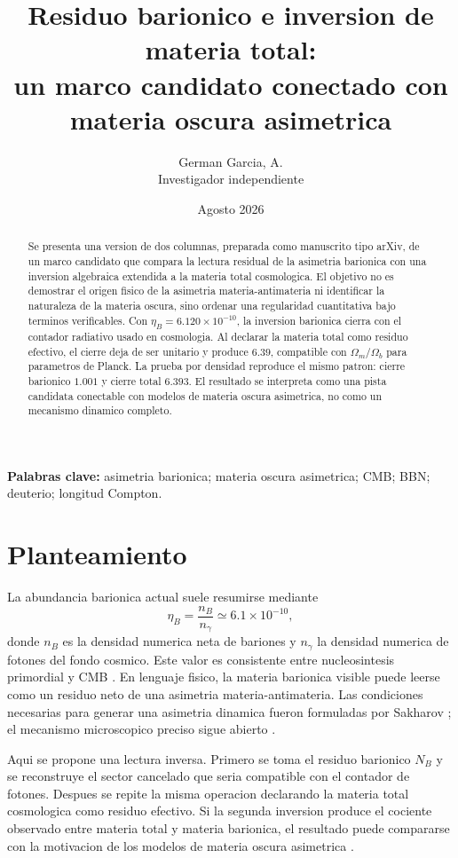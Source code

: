 \documentclass[10pt,twocolumn]{article}
\title{\vspace{-0.2in}Residuo barionico e inversion de materia total:\\
un marco candidato conectado con materia oscura asimetrica}
\author{German Garcia, A.\\Investigador independiente}
\date{Agosto 2026}
\begin{document}
\maketitle

\begin{abstract}
Se presenta una version de dos columnas, preparada como manuscrito tipo arXiv, de un marco candidato que compara la lectura residual de la asimetria barionica con una inversion algebraica extendida a la materia total cosmologica. El objetivo no es demostrar el origen fisico de la asimetria materia-antimateria ni identificar la naturaleza de la materia oscura, sino ordenar una regularidad cuantitativa bajo terminos verificables. Con $\eta_B=6.120\times10^{-10}$, la inversion barionica cierra con el contador radiativo usado en cosmologia. Al declarar la materia total como residuo efectivo, el cierre deja de ser unitario y produce $6.39$, compatible con $\Omega_m/\Omega_b$ para parametros de Planck. La prueba por densidad reproduce el mismo patron: cierre barionico $1.001$ y cierre total $6.393$. El resultado se interpreta como una pista candidata conectable con modelos de materia oscura asimetrica, no como un mecanismo dinamico completo.
\end{abstract}

\noindent\textbf{Palabras clave:} asimetria barionica; materia oscura asimetrica; CMB; BBN; deuterio; longitud Compton.

\section{Planteamiento}

La abundancia barionica actual suele resumirse mediante
\begin{equation}
\eta_B=\frac{n_B}{n_\gamma}\simeq 6.1\times10^{-10},
\end{equation}
donde $n_B$ es la densidad numerica neta de bariones y $n_\gamma$ la densidad numerica de fotones del fondo cosmico. Este valor es consistente entre nucleosintesis primordial y CMB \cite{pdg_bbn_2022,planck2018params}. En lenguaje fisico, la materia barionica visible puede leerse como un residuo neto de una asimetria materia-antimateria. Las condiciones necesarias para generar una asimetria dinamica fueron formuladas por Sakharov \cite{sakharov1967}; el mecanismo microscopico preciso sigue abierto \cite{dine_kusenko_2003,garbrecht2020}.

Aqui se propone una lectura inversa. Primero se toma el residuo barionico $N_B$ y se reconstruye el sector cancelado que seria compatible con el contador de fotones. Despues se repite la misma operacion declarando la materia total cosmologica como residuo efectivo. Si la segunda inversion produce el cociente observado entre materia total y materia barionica, el resultado puede compararse con la motivacion de los modelos de materia oscura asimetrica \cite{petraki_volkas_2013,zurek2014,boucenna_morisi_2014}.
\end{document}
